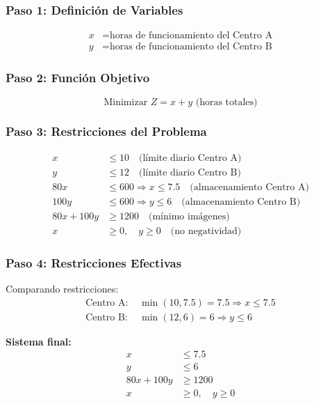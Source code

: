 \documentclass[12pt]{article}
\begin{document}
	\subsubsection*{Paso 1: Definición de Variables}
	\begin{align}
		x &= \text{horas de funcionamiento del Centro A}\\
		y &= \text{horas de funcionamiento del Centro B}
	\end{align}
	
	\subsubsection*{Paso 2: Función Objetivo}
	\begin{equation}
		\boxed{\text{Minimizar } Z = x + y \text{ (horas totales)}}
	\end{equation}
	
	\subsubsection*{Paso 3: Restricciones del Problema}
	\begin{align}
		x &\leq 10 \quad \text{(límite diario Centro A)}\\
		y &\leq 12 \quad \text{(límite diario Centro B)}\\
		80x &\leq 600 \Rightarrow x \leq 7.5 \quad \text{(almacenamiento Centro A)}\\
		100y &\leq 600 \Rightarrow y \leq 6 \quad \text{(almacenamiento Centro B)}\\
		80x + 100y &\geq 1200 \quad \text{(mínimo imágenes)}\\
		x &\geq 0, \quad y \geq 0 \quad \text{(no negatividad)}
	\end{align}
	
	\subsubsection*{Paso 4: Restricciones Efectivas}
	Comparando restricciones:
	\begin{align}
		\text{Centro A: } &\min(10, 7.5) = 7.5 \Rightarrow x \leq 7.5\\
		\text{Centro B: } &\min(12, 6) = 6 \Rightarrow y \leq 6
	\end{align}
	
	\textbf{Sistema final:}
	\begin{align}
		x &\leq 7.5\\
		y &\leq 6\\
		80x + 100y &\geq 1200\\
		x &\geq 0, \quad y \geq 0
	\end{align}
	
\end{document}
